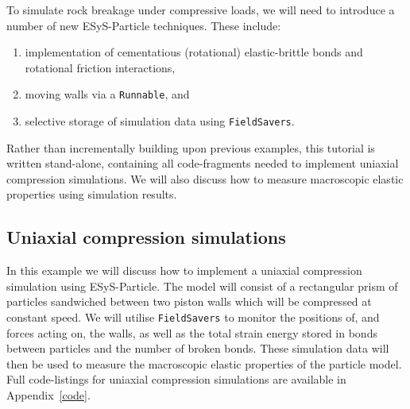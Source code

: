 To simulate rock breakage under compressive loads, we will need to introduce a number of new ESyS-Particle techniques. These include:

\begin{enumerate}
\item implementation of cementatious (rotational) elastic-brittle bonds and rotational friction interactions,
\item moving walls via a \texttt{Runnable}, and
\item selective storage of simulation data using \texttt{FieldSavers}.
\end{enumerate}

\noindent
Rather than incrementally building upon previous examples, this tutorial is written stand-alone, containing all code-fragments needed to implement uniaxial compression simulations. We will also discuss how to measure macroscopic elastic properties using simulation results.

\subsection{Uniaxial compression simulations}

In this example we will discuss how to implement a uniaxial compression simulation using ESyS-Particle. The model will consist of a rectangular prism of particles sandwiched between two piston walls which will be compressed at constant speed. We will utilise \texttt{FieldSavers} to monitor the positions of, and forces acting on, the walls, as well as the total strain energy stored in bonds between particles and the number of broken bonds. These simulation data will then be used to measure the macroscopic elastic properties of the particle model. Full code-listings for uniaxial compression simulations are available in Appendix~\ref{code}.



